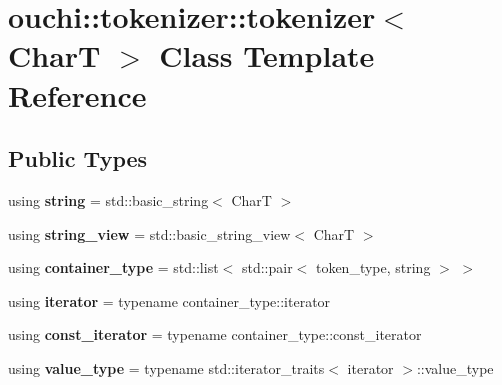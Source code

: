 \hypertarget{classouchi_1_1tokenizer_1_1tokenizer}{}\section{ouchi\+::tokenizer\+::tokenizer$<$ CharT $>$ Class Template Reference}
\label{classouchi_1_1tokenizer_1_1tokenizer}
\subsection*{Public Types}
\begin{DoxyCompactItemize}
\item 
\mbox{\label{classouchi_1_1tokenizer_1_1tokenizer_abcceadec26bc3125deb0be954a5eb2ee}} 
using {\bfseries string} = std\+::basic\+\_\+string$<$ CharT $>$
\item 
\mbox{\label{classouchi_1_1tokenizer_1_1tokenizer_ac687849f11339408d727169c632a7efa}} 
using {\bfseries string\+\_\+view} = std\+::basic\+\_\+string\+\_\+view$<$ CharT $>$
\item 
\mbox{\label{classouchi_1_1tokenizer_1_1tokenizer_af57266a577d94642fb1fd9fbb69ff8ae}} 
using {\bfseries container\+\_\+type} = std\+::list$<$ std\+::pair$<$ token\+\_\+type, string $>$ $>$
\item 
\mbox{\label{classouchi_1_1tokenizer_1_1tokenizer_ad8461063399cd55cb66498bcefc1136f}} 
using {\bfseries iterator} = typename container\+\_\+type\+::iterator
\item 
\mbox{\label{classouchi_1_1tokenizer_1_1tokenizer_ac778be06c68c3b2ef9e68cb0eca0443f}} 
using {\bfseries const\+\_\+iterator} = typename container\+\_\+type\+::const\+\_\+iterator
\item 
\mbox{\label{classouchi_1_1tokenizer_1_1tokenizer_a8711b381bb3604a280b3a3405e56e8c8}} 
using {\bfseries value\+\_\+type} = typename std\+::iterator\+\_\+traits$<$ iterator $>$\+::value\+\_\+type
\end{DoxyCompactItemize}
